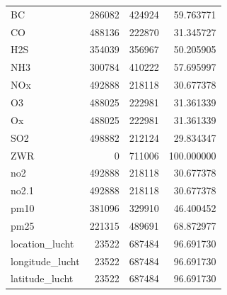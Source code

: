 \begin{tabular}{lrrr}
BC & 286082 & 424924 & 59.763771 \\
CO & 488136 & 222870 & 31.345727 \\
H2S & 354039 & 356967 & 50.205905 \\
NH3 & 300784 & 410222 & 57.695997 \\
NOx & 492888 & 218118 & 30.677378 \\
O3 & 488025 & 222981 & 31.361339 \\
Ox & 488025 & 222981 & 31.361339 \\
SO2 & 498882 & 212124 & 29.834347 \\
ZWR & 0 & 711006 & 100.000000 \\
no2 & 492888 & 218118 & 30.677378 \\
no2.1 & 492888 & 218118 & 30.677378 \\
pm10 & 381096 & 329910 & 46.400452 \\
pm25 & 221315 & 489691 & 68.872977 \\
location_lucht & 23522 & 687484 & 96.691730 \\
longitude_lucht & 23522 & 687484 & 96.691730 \\
latitude_lucht & 23522 & 687484 & 96.691730 \\
\bottomrule
\end{tabular}
